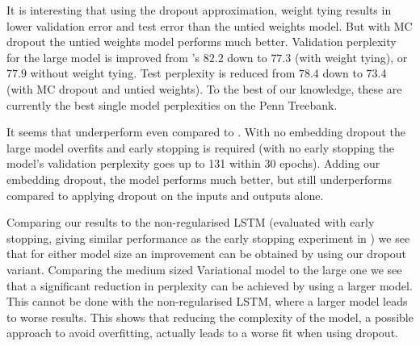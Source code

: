 \documentclass{article}
\theoremstyle{definition}
\begin{document}
It is interesting that using the dropout approximation, weight tying results in lower validation error and test error than the untied weights model. But with MC dropout the untied weights model performs much better.
Validation perplexity for the large model is improved from \citep{zaremba2014recurrent}'s $82.2$ down to $77.3$ (with weight tying), or $77.9$ without weight tying. Test perplexity is reduced from $78.4$ down to $73.4$ (with MC dropout and untied weights). To the best of our knowledge, these are currently the best single model perplexities on the Penn Treebank.

It seems that \citet{moon2015rnndrop} underperform even compared to \citep{zaremba2014recurrent}. With no embedding dropout the large model overfits and early stopping is required (with no early stopping the model's validation perplexity goes up to 131 within 30 epochs). Adding our embedding dropout, the model performs much better, but still underperforms compared to applying dropout on the inputs and outputs alone.

Comparing our results to the non-regularised LSTM (evaluated with early stopping, giving similar performance as the early stopping experiment in \citep{zaremba2014recurrent}) we see that for either model size an improvement can be obtained by using our dropout variant. Comparing the medium sized Variational model to the large one we see that a significant reduction in perplexity can be achieved by using a larger model. This cannot be done with the non-regularised LSTM, where a larger model leads to worse results. This shows that reducing the complexity of the model, a possible approach to avoid overfitting, actually leads to a worse fit when using dropout. 
\end{document}
